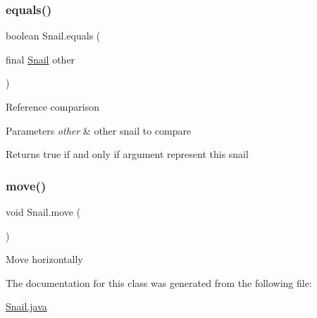 \subsubsection{\texorpdfstring{equals()}{equals()}}
{\footnotesize\ttfamily boolean Snail.\+equals (\begin{DoxyParamCaption}\item[{final \mbox{\hyperlink{class_snail}{Snail}}}]{other }\end{DoxyParamCaption})\hspace{0.3cm}{\ttfamily [inline]}}

Reference comparison 
\begin{DoxyParams}{Parameters}
{\em other} & other snail to compare \\
\hline
\end{DoxyParams}
\begin{DoxyReturn}{Returns}
true if and only if argument represent this snail 
\end{DoxyReturn}
\mbox{\label{class_snail_ad7f5483ed4eb1202d1d61d741a1f4236}} 
\subsubsection{\texorpdfstring{move()}{move()}}
{\footnotesize\ttfamily void Snail.\+move (\begin{DoxyParamCaption}{ }\end{DoxyParamCaption})\hspace{0.3cm}{\ttfamily [inline]}}

Move horizontally 

The documentation for this class was generated from the following file\+:\begin{DoxyCompactItemize}
\item 
\mbox{\hyperlink{_snail_8java}{Snail.\+java}}\end{DoxyCompactItemize}
